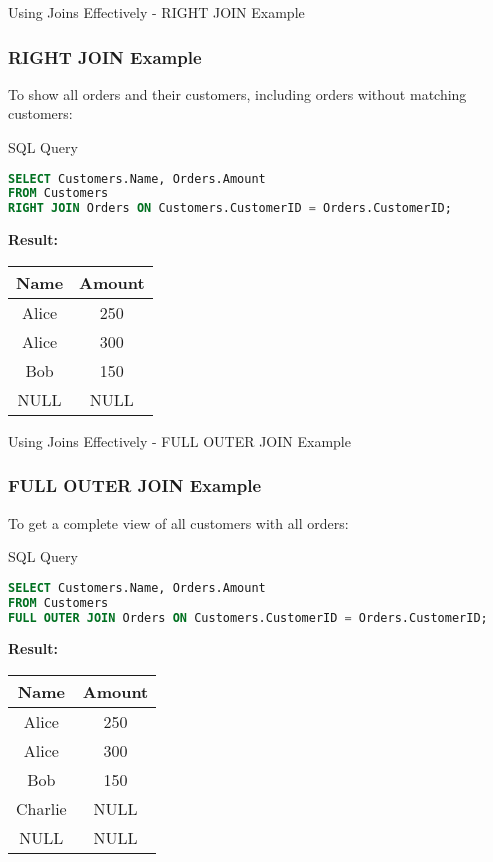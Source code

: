\documentclass[aspectratio=169]{beamer}
\begin{document}
\begin{frame}[fragile]{Using Joins Effectively - RIGHT JOIN Example}
    \frametitle{RIGHT JOIN Example}
    To show all orders and their customers, including orders without matching customers:
    
    \begin{block}{SQL Query}
    \begin{lstlisting}[language=SQL]
SELECT Customers.Name, Orders.Amount
FROM Customers
RIGHT JOIN Orders ON Customers.CustomerID = Orders.CustomerID;
    \end{lstlisting}
    \end{block}

    \textbf{Result:}
    \begin{center}
        \begin{tabular}{|c|c|}
            \hline
            Name  & Amount \\
            \hline
            Alice & 250    \\
            Alice & 300    \\
            Bob   & 150    \\
            NULL  & NULL   \\
            \hline
        \end{tabular}
    \end{center}
\end{frame}

\begin{frame}[fragile]{Using Joins Effectively - FULL OUTER JOIN Example}
    \frametitle{FULL OUTER JOIN Example}
    To get a complete view of all customers with all orders:
    
    \begin{block}{SQL Query}
    \begin{lstlisting}[language=SQL]
SELECT Customers.Name, Orders.Amount
FROM Customers
FULL OUTER JOIN Orders ON Customers.CustomerID = Orders.CustomerID;
    \end{lstlisting}
    \end{block}

    \textbf{Result:}
    \begin{center}
        \begin{tabular}{|c|c|}
            \hline
            Name    & Amount \\
            \hline
            Alice   & 250    \\
            Alice   & 300    \\
            Bob     & 150    \\
            Charlie & NULL   \\
            NULL    & NULL   \\
            \hline
        \end{tabular}
    \end{center}
\end{frame}
\end{document}
